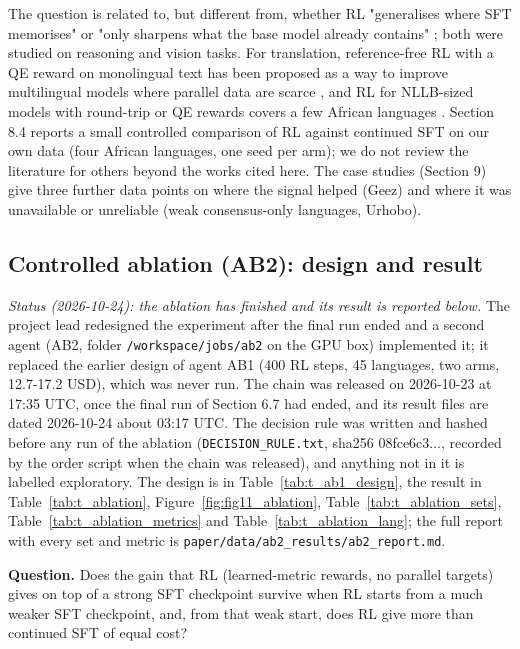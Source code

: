The question is related to, but different from, whether RL "generalises where SFT memorises" \citep{chu2025sft} or "only sharpens what the base model already contains" \citep{yue2025doesrl}; both were studied on reasoning and vision tasks. For translation, reference-free RL with a QE reward on monolingual text has been proposed as a way to improve multilingual models where parallel data are scarce \citep{liu2026walar, han2026milmmtrl}, and RL for NLLB-sized models with round-trip or QE rewards covers a few African languages \citep{attia2026roundtrip, garciaestrada2026reffree}. Section 8.4 reports a small controlled comparison of RL against continued SFT on our own data (four African languages, one seed per arm); we do not review the literature for others beyond the works cited here. The case studies (Section 9) give three further data points on where the signal helped (Ge\textquotesingle ez) and where it was unavailable or unreliable (weak consensus-only languages, Urhobo).

\subsection{Controlled ablation (AB2): design and result}\label{controlled-ablation-ab2-design-and-result}

\emph{Status (2026-10-24): the ablation has finished and its result is reported below.} The project lead redesigned the experiment after the final run ended and a second agent (AB2, folder \texttt{/workspace/jobs/ab2} on the GPU box) implemented it; it replaced the earlier design of agent AB1 (400 RL steps, 45 languages, two arms, 12.7-17.2 USD), which was never run. The chain was released on 2026-10-23 at 17:35 UTC, once the final run of Section 6.7 had ended, and its result files are dated 2026-10-24 about 03:17 UTC. The decision rule was written and hashed before any run of the ablation (\texttt{DECISION\_RULE.txt}, sha256 08fce6c3..., recorded by the order script when the chain was released), and anything not in it is labelled exploratory. The design is in Table~\ref{tab:t_ab1_design}, the result in Table~\ref{tab:t_ablation}, Figure~\ref{fig:fig11_ablation}, Table~\ref{tab:t_ablation_sets}, Table~\ref{tab:t_ablation_metrics} and Table~\ref{tab:t_ablation_lang}; the full report with every set and metric is \texttt{paper/data/ab2\_results/ab2\_report.md}.

\textbf{Question.} Does the gain that RL (learned-metric rewards, no parallel targets) gives on top of a strong SFT checkpoint survive when RL starts from a much weaker SFT checkpoint, and, from that weak start, does RL give more than continued SFT of equal cost?

